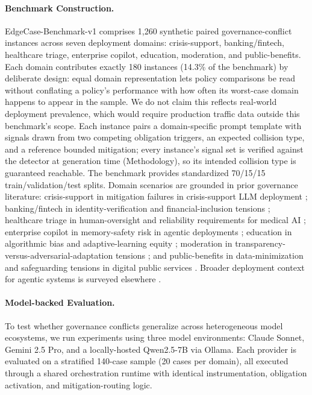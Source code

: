 \documentclass[letterpaper]{article} %
\begin{document}
\paragraph{Benchmark Construction.} EdgeCase-Benchmark-v1 comprises 1,260 synthetic paired governance-conflict instances across seven deployment domains: crisis-support, banking/fintech, healthcare triage, enterprise copilot, education, moderation, and public-benefits. Each domain contributes exactly 180 instances (14.3\% of the benchmark) by deliberate design: equal domain representation lets policy comparisons be read without conflating a policy's performance with how often its worst-case domain happens to appear in the sample. We do not claim this reflects real-world deployment prevalence, which would require production traffic data outside this benchmark's scope. Each instance pairs a domain-specific prompt template with signals drawn from two competing obligation triggers, an expected collision type, and a reference bounded mitigation; every instance's signal set is verified against the detector at generation time (Methodology), so its intended collision type is guaranteed reachable. The benchmark provides standardized 70/15/15 train/validation/test splits. Domain scenarios are grounded in prior governance literature: crisis-support in mitigation failures in crisis-support LLM deployment \citep{miner2020suicide}; banking/fintech in identity-verification and financial-inclusion tensions \citep{fsb2017ai,bis2024ai}; healthcare triage in human-oversight and reliability requirements for medical AI \citep{topol2019highperformance,singhal2025llms,hoffmann2024llms}; enterprise copilot in memory-safety risk in agentic deployments \citep{openai2024memory,jagielski2023poisoning}; education in algorithmic bias and adaptive-learning equity \citep{holmes2022ethics,baker2019fairness}; moderation in transparency-versus-adversarial-adaptation tensions \citep{gillespie2018custodians,kolt2025governing}; and public-benefits in data-minimization and safeguarding tensions in digital public services \citep{ec2023digital,oecd2024safeguarding,oecd2024classification}. Broader deployment context for agentic systems is surveyed elsewhere \citep{staufer2026index,yuan2024benchmarking,xu2024bagoftricks,wang2025agentspec,whittaker2025agentic,doshivelez2017rigorous}.

\paragraph{Model-backed Evaluation.} To test whether governance conflicts generalize across heterogeneous model ecosystems, we run experiments using three model environments: Claude Sonnet, Gemini 2.5 Pro, and a locally-hosted Qwen2.5-7B via Ollama. Each provider is evaluated on a stratified 140-case sample (20 cases per domain), all executed through a shared orchestration runtime with identical instrumentation, obligation activation, and mitigation-routing logic.
\end{document}
